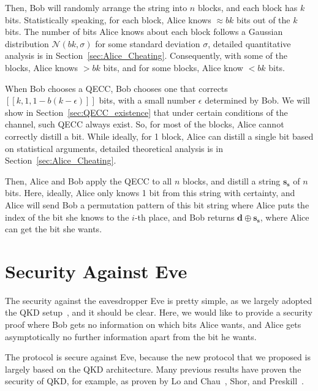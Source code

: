 \documentclass[%
 reprint,
superscriptaddress,
 amsmath,amssymb,
 aps,
]{revtex4-2}
\begin{document}
Then, Bob will randomly arrange the string into $n$ blocks, and each block has $k$ bits. Statistically speaking, for each block, Alice knows $\approx bk$ bits out of the $k$ bits. The number of bits Alice knows about each block follows a Gaussian distribution $\mathcal{N}(bk, \sigma)$ for some standard deviation $\sigma$, detailed quantitative analysis is in Section~\ref{sec:Alice_Cheating}. Consequently, with some of the blocks, Alice knows $> bk$ bits, and for some blocks, Alice know $< bk$ bits.

When Bob chooses a QECC, Bob chooses one that corrects $[[k, 1, 1-b(k-\epsilon)]]$ bits, with a small number $\epsilon$ determined by Bob. We will show in Section~\ref{sec:QECC_existence} that under certain conditions of the channel, such QECC always exist. So, for most of the blocks, Alice cannot correctly distill a bit. While ideally, for 1 block, Alice can distill a single bit based on statistical arguments, detailed theoretical analysis is in Section~\ref{sec:Alice_Cheating}.

Then, Alice and Bob apply the QECC to all $n$ blocks, and distill a string $\mathbf{s_s}$ of $n$ bits. Here, ideally, Alice only knows 1 bit from this string with certainty, and Alice will send Bob a permutation pattern of this bit string where Alice puts the index of the bit she knows to the $i$-th place, and Bob returns $\mathbf{d}\oplus \mathbf{s_s}$, where Alice can get the bit she wants.


\section{Security Against Eve}
\label{sec:Security_against_Eve}
The security against the eavesdropper Eve is pretty simple, as we largely adopted the QKD setup~\cite{BB84, BB84_30years, BBM92}, and it should be clear. Here, we would like to provide a security proof where Bob gets no information on which bits Alice wants, and Alice gets asymptotically no further information apart from the bit he wants.

The protocol is secure against Eve, because the new protocol that we proposed is largely based on the QKD architecture. Many previous results have proven the security of QKD, for example, as proven by Lo and Chau~\cite{Lo_Chau_proof}, Shor, and Preskill~\cite{Shor_Preskill_Proof1}.
\end{document}
